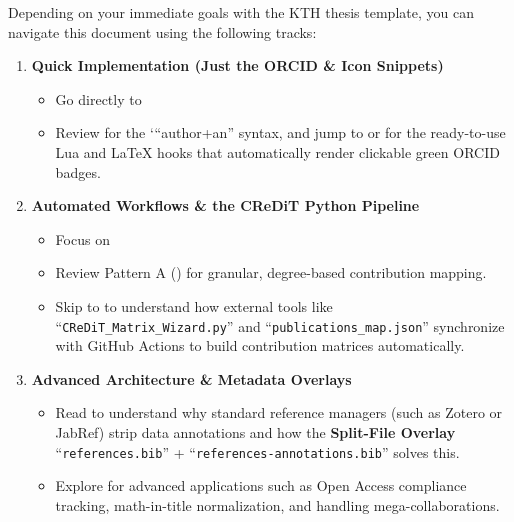 \documentclass[12pt, twoside]{article}
\newcommand{\fname}[1]{\texttt{#1}}
\begin{document}
Depending on your immediate goals with the \gls{KTH} thesis template, you can navigate this document using the following tracks:
\begin{enumerate}[leftmargin=*, label=\textbf{Track \arabic*}, ref=Track \arabic*]
    \item \textbf{Quick Implementation (Just the ORCID \& Icon Snippets)}
    \begin{itemize}
    \item Go directly to 
    \item 
Review  for the `\enquote{author+an} syntax, and jump to  or  for the ready-to-use Lua and LaTeX hooks that automatically render clickable green ORCID badges.
    \end{itemize}

    \item \textbf{Automated Workflows \& the CReDiT Python Pipeline}
    \begin{itemize}
    \item  Focus on 
    
    \item  Review Pattern A () for granular, degree-based contribution mapping.
       
    \item Skip to  to understand how external tools like \enquote{\fname{CReDiT\_Matrix\_Wizard.py}} and \enquote{\fname{publications\_map.json}} synchronize with GitHub Actions to build contribution matrices automatically.
    \end{itemize}
    
\item \textbf{Advanced Architecture \& Metadata Overlays}
    \begin{itemize} 
    \item Read  to understand why standard reference managers (such as Zotero or JabRef) strip data annotations and how the \textbf{Split-File Overlay} \enquote{\fname{references.bib}} + \enquote{\fname{references-annotations.bib}} solves this.
    \item Explore  for advanced applications such as Open Access compliance tracking, math-in-title normalization, and handling mega-collaborations.
    \end{itemize}
\end{enumerate}
\end{document}
